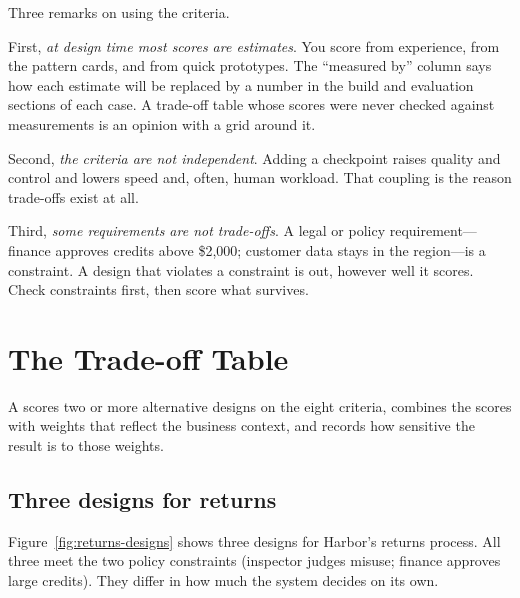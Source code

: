 Three remarks on using the criteria.

First, \emph{at design time most scores are estimates}. You score from experience, from the pattern cards, and from quick prototypes. The ``measured by'' column says how each estimate will be replaced by a number in the build and evaluation sections of each case. A trade-off table whose scores were never checked against measurements is an opinion with a grid around it.

Second, \emph{the criteria are not independent}. Adding a checkpoint raises quality and control and lowers speed and, often, human workload. That coupling is the reason trade-offs exist at all.

Third, \emph{some requirements are not trade-offs}. A legal or policy requirement---finance approves credits above \$2{,}000; customer data stays in the region---is a constraint. A design that violates a constraint is out, however well it scores. Check constraints first, then score what survives.

\section{The Trade-off Table}
\label{sec:tradeoff}

\begin{definition}
A  scores two or more alternative designs on the eight criteria, combines the scores with weights that reflect the business context, and records how sensitive the result is to those weights.
\end{definition}

\subsection{Three designs for returns}

Figure~\ref{fig:returns-designs} shows three designs for Harbor's returns process. All three meet the two policy constraints (inspector judges misuse; finance approves large credits). They differ in how much the system decides on its own.

